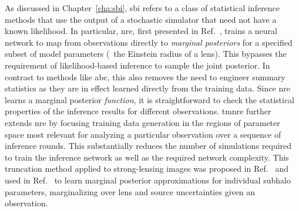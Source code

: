 As discussed in Chapter~\ref{cha:sbi}, \gls*{sbi} refers to a class of statistical inference methods that use the output of a stochastic simulator that need not have a known likelihood. In particular, \gls*{nre}, first presented in Ref.~\cite{Hermans:2019ioj}, trains a neural network to map from observations directly to \emph{marginal posteriors} for a specified subset of model parameters (\eg~the Einstein radius of a lens). This bypasses the requirement of likelihood-based inference to sample the joint posterior. In contrast to methods like \gls*{abc}, this also removes the need to engineer summary statistics \cite{He:2020rkj} as they are in effect learned directly from the training data. Since \gls*{nre} learns a marginal posterior \emph{function}, it is straightforward to check the statistical properties of the inference results for different observations. \gls*{tmnre} further extends \gls*{nre} by focusing training data generation in the regions of parameter space most relevant for analyzing a particular observation over a sequence of inference rounds. This substantially reduces the number of simulations required to train the inference network as well as the required network complexity. This truncation method applied to strong-lensing images was proposed in Ref.~\cite{Karchev:2021fro} and used in Ref.~\cite{Coogan:2020yux} to learn marginal posterior approximations for individual subhalo parameters, marginalizing over lens and source uncertainties given an observation.

